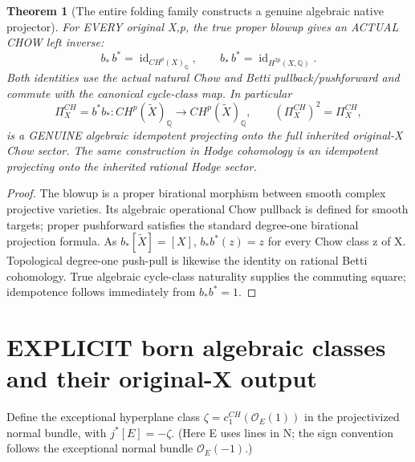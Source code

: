 \documentclass[11pt]{article}
\newtheorem{theorem}{Theorem}[section]
\begin{document}
\begin{theorem}[The entire folding family constructs a genuine algebraic native projector]
For EVERY original X,p, the true proper blowup
gives an ACTUAL CHOW left inverse:
\[
 \boxed{
 b_*\,b^*=\operatorname{id}_{CH^p(X)_\mathbb Q},
 \qquad
 b_*\,b^*=\operatorname{id}_{H^{2p}(X,\mathbb Q)}.
 }                                                       \tag{11}
\]
Both identities use the actual natural Chow and Betti
pullback/pushforward and commute with the canonical
cycle-class map. In particular
\[
 \boxed{
 \Pi_X^{CH}=b^*b_*
 :CH^p(\widetilde X)_\mathbb Q\to CH^p(\widetilde X)_\mathbb Q,
 \qquad
 (\Pi_X^{CH})^2=\Pi_X^{CH},
 }                                                       \tag{12}
\]
is a GENUINE algebraic idempotent projecting onto the
full inherited original-X Chow sector. The same construction
in Hodge cohomology is an idempotent projecting onto
the inherited rational Hodge sector.
\end{theorem}
\begin{proof}
The blowup is a proper birational morphism between
smooth complex projective varieties. Its algebraic
operational Chow pullback is defined for smooth targets;
proper pushforward satisfies the standard degree-one
birational projection formula. As $b_*[\widetilde X]=[X]$,
$b_*b^*(z)=z$ for every Chow class z of X.
Topological degree-one push-pull is likewise
the identity on rational Betti cohomology.
True algebraic cycle-class naturality supplies the
commuting square; idempotence follows immediately
from $b_*b^*=1$.
\end{proof}

\section{EXPLICIT born algebraic classes and their original-X output}
Define the exceptional hyperplane class
$\zeta=c_1^{CH}(\mathcal O_E(1))$
in the projectivized normal bundle, with
$j^*[E]=-\zeta$. (Here E uses lines in N;
the sign convention follows the exceptional normal bundle
$\mathcal O_E(-1)$.)
\end{document}
